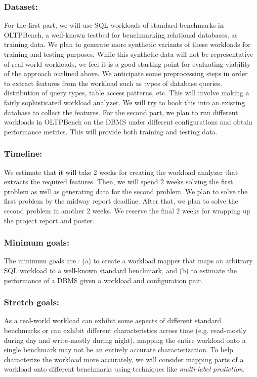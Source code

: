\documentclass{article}
\begin{document}
\subsubsection*{Dataset:} 
For the first part, we will use SQL workloads of standard benchmarks
in OLTPBench\cite{oltpbench14}, a well-known testbed for benchmarking 
relational databases, as training data. We plan to generate 
more synthetic variants of these workloads for training and testing
purposes. While this synthetic data will not be representative of 
real-world workloads, we feel it is a good starting point for 
evaluating viability of the approach outlined above.
We anticipate some preprocessing steps in order to extract
features from the workload such as types of database queries, 
distribution of query types, table access patterns, etc. This will 
involve making a fairly sophisticated workload analyzer. We will try 
to hook this into an existing database to collect the features.
For the second part, we plan to run different workloads in OLTPBench  
on the DBMS under different configurations and obtain performance metrics. 
This will provide both training and testing data.

\subsubsection*{Timeline:} 
We estimate that it will take 2 weeks for creating the workload analyzer
that extracts the required features. Then, we will spend 2 weeks 
solving the first problem as well as generating data for the second problem. 
We plan to solve the first problem by the midway report deadline.
After that, we plan to solve the second problem in another 2 weeks. 
We reserve the final 2 weeks for wrapping up the project report and poster.

\subsubsection*{Minimum goals:}
The minimum goals are : (a) to create a workload mapper that maps an arbitrary 
SQL workload to a well-known standard benchmark, and (b) to estimate the
performance of a DBMS given a workload and configuration pair.

\subsubsection*{Stretch goals:} 
As a real-world workload can exhibit some aspects of different standard 
benchmarks or can exhibit different characteristics across time (e.g. read-mostly 
during day and write-mostly during night), mapping the entire workload onto 
a single benchmark may not be an entirely accurate characterization. 
To help characterize the workload more accurately, we will consider mapping 
parts of a workload onto different benchmarks using techniques like  
\textit{multi-label prediction}. 
\end{document}

